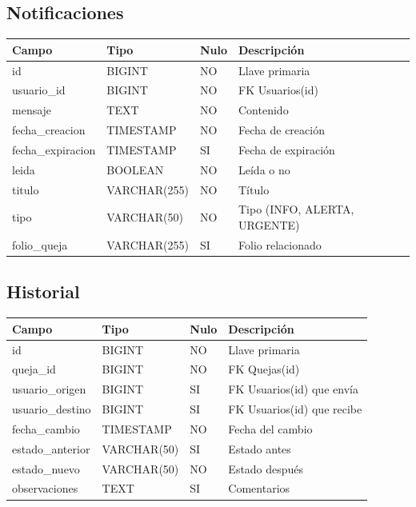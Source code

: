 \documentclass[11pt,letterpaper]{article}
\begin{document}
\subsection{Notificaciones}
\begin{longtable}{|p{4.2cm}|p{3.2cm}|p{2.2cm}|p{4.5cm}|}
\hline
\rowcolor{lightgray} \textbf{Campo} & \textbf{Tipo} & \textbf{Nulo} & \textbf{Descripción} \\
\hline
id & BIGINT & NO & Llave primaria \\
\hline
usuario\_id & BIGINT & NO & FK Usuarios(id) \\
\hline
mensaje & TEXT & NO & Contenido \\
\hline
fecha\_creacion & TIMESTAMP & NO & Fecha de creación \\
\hline
fecha\_expiracion & TIMESTAMP & SI & Fecha de expiración \\
\hline
leida & BOOLEAN & NO & Leída o no \\
\hline
titulo & VARCHAR(255) & NO & Título \\
\hline
tipo & VARCHAR(50) & NO & Tipo (INFO, ALERTA, URGENTE) \\
\hline
folio\_queja & VARCHAR(255) & SI & Folio relacionado \\
\hline
\end{longtable}

\subsection{Historial}
\begin{longtable}{|p{4.2cm}|p{3.2cm}|p{2.2cm}|p{4.5cm}|}
\hline
\rowcolor{lightgray} \textbf{Campo} & \textbf{Tipo} & \textbf{Nulo} & \textbf{Descripción} \\
\hline
id & BIGINT & NO & Llave primaria \\
\hline
queja\_id & BIGINT & NO & FK Quejas(id) \\
\hline
usuario\_origen & BIGINT & SI & FK Usuarios(id) que envía \\
\hline
usuario\_destino & BIGINT & SI & FK Usuarios(id) que recibe \\
\hline
fecha\_cambio & TIMESTAMP & NO & Fecha del cambio \\
\hline
estado\_anterior & VARCHAR(50) & SI & Estado antes \\
\hline
estado\_nuevo & VARCHAR(50) & NO & Estado después \\
\hline
observaciones & TEXT & SI & Comentarios \\
\hline
\end{longtable}
\end{document}

